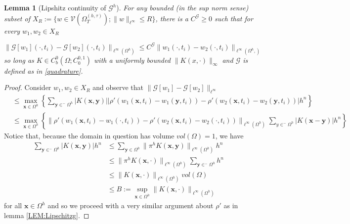 \documentclass[aps,
preprint,
groupedaddress,
showkeys,
amsmath]{revtex4-2}
\newtheorem{lemma}{Lemma}
\begin{document}
    \begin{lemma}[Lipshitz continuity of $\mathcal{G}^h$]\label{LEM:DiscreteLipschitz}
        For any  bounded (in the sup norm sense) subset of $X_R:=\{w\in \mathcal{V}(\Omega^{(h,\tau)}_T);\|w\|_{\ell^\infty}\leq R\}$, there is a $C^\mathcal{G}\geq 0$ such that for every $w_1, w_2\in X_{R}$
        
       \[\|\mathcal{G}[w_1](\cdot, t_i)-\mathcal{G}[w_2](\cdot, t_i)\|_{\ell^\infty\left(\Omega^h\right)}\leq C^\mathcal{G}\|w_1(\cdot, t_i)-w_2(\cdot, t_i)\|_{\ell^\infty\left(\Omega^h,\right)}\]
        so long as $K\in C^0_b(\Omega;C^{0,1}_0)$ with a uniformly bounded $\|K(x,\cdot)\|_\infty$ and $\mathcal{G}$ is defined as in \eqref{quadrature}.
    \end{lemma}

    \begin{proof}
        Consider $w_1, w_2\in X_R$ and observe that $\|\mathcal{G}[w_1]-\mathcal{G}[w_2]\|_{\ell^\infty}$
        \begin{equation*}
        \begin{split}
            &\leq \max_{\mathbf{x}\in \Omega^h}\left\{\sum_{\mathbf{y}\in ^-\Omega^h}|K(\mathbf{x},\mathbf{y})||\rho'(w_1(\mathbf{x},t_i)-w_1(\mathbf{y},t_i))-\rho'(w_2(\mathbf{x},t_i)-w_2(\mathbf{y},t_i))|h^n\right\}\\
            &\leq \max_{\mathbf{x}\in \Omega^h}\left\{\|\rho'(w_1(\mathbf{x},t_i)-w_1(\cdot,t_i))-\rho'(w_2(\mathbf{x},t_i)-w_2(\cdot,t_i))\|_{\ell^\infty(\Omega^h)}\sum_{y\in^-\Omega^h}|K(\mathbf{x}-\mathbf{y})|h^n\right\}
            \end{split}
        \end{equation*}
        Notice that, because the domain in question has volume $vol(\Omega)=1$, we have \begin{equation*}
        \begin{split}
        \sum_{\mathbf{y}\in^-\Omega^h}|K(\mathbf{x},\mathbf{y})|h^n &\leq \sum_{\mathbf{y}\in \Omega^{h}}\|\pi^hK(\mathbf{x},\mathbf{y})\|_{\ell^\infty(\Omega^{h})}h^n\\
        &\leq\|\pi^h K(\mathbf{x},\cdot)\|_{\ell^\infty(\Omega^h)}\sum_{\mathbf{y}\in^-\Omega^h}h^n\\
        &\leq \|K(\mathbf{x},\cdot)\|_{\ell^\infty(\Omega^h)}vol(\Omega)\\
        &\leq B:=\sup_{\mathbf{x}\in\Omega^h}\|K(\mathbf{x},\cdot)\|_{\ell^\infty(\Omega^h)}
        \end{split}
        \end{equation*}
        for all $\mathbf{x}\in \Omega^h$ and so we proceed with a very similar argument about $\rho'$ as in lemma \ref{LEM:Lipschitzg}.


\end{proof}
\end{document}
